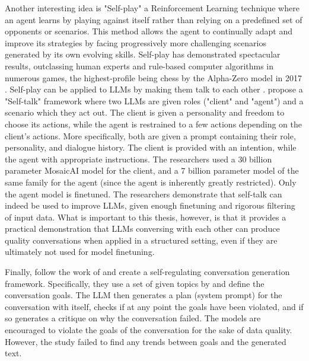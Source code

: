 Another interesting idea is "Self-play" a Reinforcement Learning technique where an agent learns by playing against itself rather than relying on a predefined set of opponents or scenarios. This method allows the agent to continually adapt and improve its strategies by facing progressively more challenging scenarios generated by its own evolving skills. Self-play has demonstrated spectacular results, outclassing human experts and rule-based computer algorithms in numerous games, the highest-profile being chess by the Alpha-Zero model in 2017 \cite{silver2017masteringchessshogiselfplay}. Self-play can be applied to LLMs by making them talk to each other \cite{cheng2024selfplayingadversariallanguagegame}.  \cite{ulmer2024bootstrappingllmbasedtaskorienteddialogue} propose a "Self-talk" framework where two LLMs are given roles ("client" and "agent") and a scenario which they act out. The client is given a personality and freedom to choose its actions, while the agent is restrained to a few actions depending on the client's actions. More specifically, both are given a prompt containing their role, personality, and dialogue history. The client is provided with an intention, while the agent with appropriate instructions. The researchers used a 30 billion parameter MosaicAI \cite{MosaicML2023} model for the client, and a 7 billion parameter model of the same family for the agent (since the agent is inherently greatly restricted). Only the agent model is finetuned. The researchers demonstrate that self-talk can indeed be used to improve LLMs, given enough finetuning and rigorous filtering of input data. What is important to this thesis, however, is that it provides a practical demonstration that LLMs conversing with each other can produce quality conversations when applied in a structured setting, even if they are ultimately not used for model finetuning.


Finally, \cite{lambert2024selfdirectedsyntheticdialoguesrevisions} follow the work of \cite{Bai2022ConstitutionalAH} and create a self-regulating conversation generation framework. Specifically, they use a set of given topics by \cite{Castricato2024SuppressingPE} and define the conversation goals. The LLM then generates a plan (system prompt) for the conversation with itself, checks if at any point the goals have been violated, and if so generates a critique on why the conversation failed. The models are encouraged to violate the goals of the conversation for the sake of data quality. However, the study failed to find any trends between goals and the generated text.

